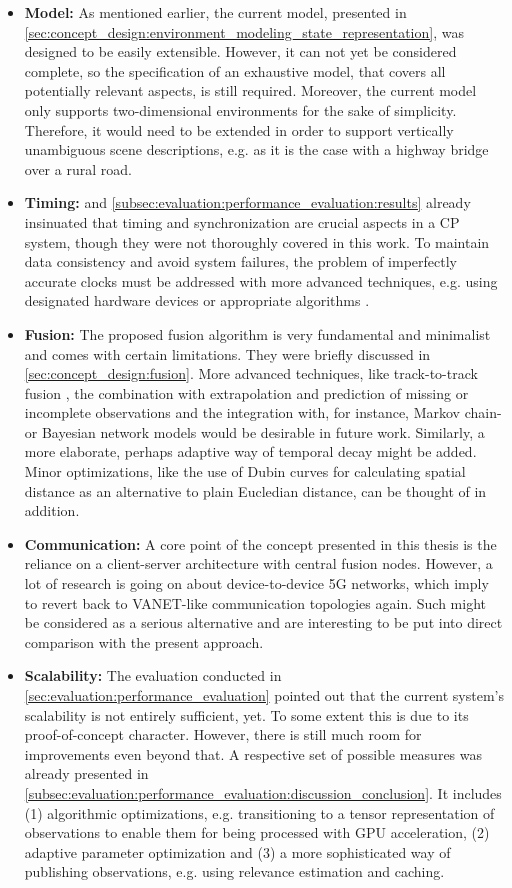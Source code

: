 \begin{itemize}
	\item \textbf{Model:} As mentioned earlier, the current model, presented in \cref{sec:concept_design:environment_modeling_state_representation}, was designed to be easily extensible. However, it can not yet be considered complete, so the specification of an exhaustive model, that covers all potentially relevant aspects, is still required. Moreover, the current model only supports two-dimensional environments for the sake of simplicity. Therefore, it would need to be extended in order to support vertically unambiguous scene descriptions, e.g. as it is the case with a highway bridge over a rural road. 
	\item \textbf{Timing:}  and \cref{subsec:evaluation:performance_evaluation:results} already insinuated that timing and synchronization are crucial aspects in a CP system, though they were not thoroughly covered in this work. To maintain data consistency and avoid system failures, the problem of imperfectly accurate clocks must be addressed with more advanced techniques, e.g. using designated hardware devices \cite{Rauch2011} or appropriate algorithms \cite{Julier}. 
	\item \textbf{Fusion:} The proposed fusion algorithm is very fundamental and minimalist and comes with certain limitations. They were briefly discussed in \cref{sec:concept_design:fusion}. More advanced techniques, like track-to-track fusion \cite{Rauch2011}, the combination with extrapolation and prediction of missing or incomplete observations and the integration with, for instance, Markov chain- or Bayesian network models would be desirable in future work. Similarly, a more elaborate, perhaps adaptive way of temporal decay might be added. Minor optimizations, like the use of Dubin curves for calculating spatial distance as an alternative to plain Eucledian distance, can be thought of in addition. 
	\item \textbf{Communication:} A core point of the concept presented in this thesis is the reliance on a client-server architecture with central fusion nodes. However, a lot of research is going on about device-to-device 5G networks, which imply to revert back to VANET-like communication topologies again. Such might be considered as a serious alternative and are interesting to be put into direct comparison with the present approach. 
	\item \textbf{Scalability:} The evaluation conducted in \cref{sec:evaluation:performance_evaluation} pointed out that the current system's scalability is not entirely sufficient, yet. To some extent this is due to its proof-of-concept character. However, there is still much room for improvements even beyond that. A respective set of possible measures was already presented in \cref{subsec:evaluation:performance_evaluation:discussion_conclusion}. It includes (1) algorithmic optimizations, e.g. transitioning to a tensor representation of observations \cite{Petrich2018} to enable them for being processed with GPU acceleration, (2) adaptive parameter optimization and (3) a more sophisticated way of publishing observations, e.g. using relevance estimation \cite{Breu2013} and caching. 

\end{itemize}
